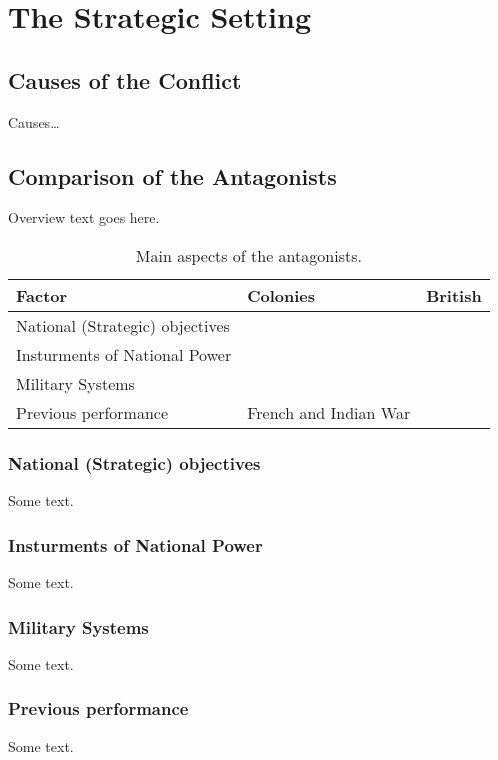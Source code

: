 \section{The Strategic Setting}

\subsection{Causes of the Conflict}

Causes\ldots

\subsection{Comparison of the Antagonists}

Overview text goes here.

\begin{table}
\caption{Main aspects of the antagonists.}
\begin{tabular}{p{2in}p{2in}p{2in}}
Factor				&	Colonies	& British	\\\hline
National (Strategic) objectives	&			&		\\
Insturments of National Power	&			&		\\
Military Systems		&			&		\\
Previous performance		& French and Indian War	&		\\
\end{tabular}
\end{table}

\subsubsection{National (Strategic) objectives}

Some text.

\subsubsection{Insturments of National Power}

Some text.

\subsubsection{Military Systems}

Some text.

\subsubsection{Previous performance}

Some text.

